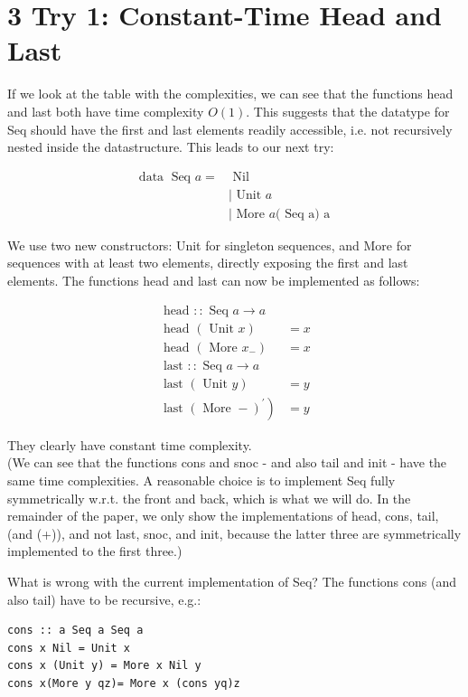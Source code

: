 \documentclass[10pt]{article}
\begin{document}
\section*{3 Try 1: Constant-Time Head and Last}
If we look at the table with the complexities, we can see that the functions head and last both have time complexity $O(1)$. This suggests that the datatype for Seq should have the first and last elements readily accessible, i.e. not recursively nested inside the datastructure. This leads to our next try:

$$
\begin{aligned}
\operatorname{data} \text { Seq } a= & \text { Nil } \\
& \mid \text { Unit } a \\
& \mid \text { More } a(\text { Seq a) a }
\end{aligned}
$$

We use two new constructors: Unit for singleton sequences, and More for sequences with at least two elements, directly exposing the first and last elements. The functions head and last can now be implemented as follows:

$$
\begin{array}{ll}
\text { head }:: \text { Seq } a \rightarrow a & \\
\text { head }(\text { Unit } x) & =x \\
\text { head }\left(\text { More } x_{-}\right) & =x \\
\text { last }:: \text { Seq } a \rightarrow a & \\
\text { last }(\text { Unit } y) & =y \\
\text { last } \left.(\text { More }-)^{\prime}\right) & =y
\end{array}
$$

They clearly have constant time complexity.\\
(We can see that the functions cons and snoc - and also tail and init - have the same time complexities. A reasonable choice is to implement Seq fully symmetrically w.r.t. the front and back, which is what we will do. In the remainder of the paper, we only show the implementations of head, cons, tail, (and (+)), and not last, snoc, and init, because the latter three are symmetrically implemented to the first three.)

What is wrong with the current implementation of Seq? The functions cons (and also tail) have to be recursive, e.g.:

\begin{verbatim}
cons :: a Seq a Seq a
cons x Nil = Unit x
cons x (Unit y) = More x Nil y
cons x(More y qz)= More x (cons yq)z
\end{verbatim}
\end{document}
